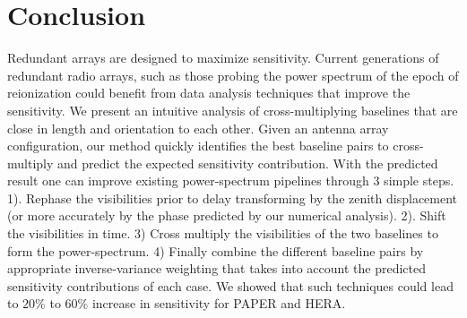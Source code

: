 \documentclass[twocolumn,apj,numberedappendix]{emulateapj}
\renewcommand\[{\begin{equation}}
\renewcommand\]{\end{equation}}
\begin{document}
\section{Conclusion}
Redundant arrays are designed to maximize sensitivity. Current generations of redundant radio arrays, such as those probing the power spectrum of the epoch of reionization could benefit from data analysis techniques that improve the sensitivity. We present an intuitive analysis of cross-multiplying baselines that are close in length and orientation to each other. Given an antenna array configuration, our method quickly identifies the best baseline pairs to cross-multiply and predict the expected sensitivity contribution. With the predicted result one can improve existing power-spectrum pipelines through 3 simple steps. 1). Rephase the visibilities prior to delay transforming by the zenith displacement (or more accurately by the phase predicted by our numerical analysis). 2). Shift the visibilities in time. 3) Cross multiply the visibilities of the two baselines  to form the power-spectrum. 4) Finally combine the different baseline pairs by appropriate inverse-variance weighting that takes into account the predicted sensitivity contributions of each case. We showed that such techniques could lead to $20\%$ to $60\%$ increase in sensitivity for PAPER and HERA. 
\end{document}
